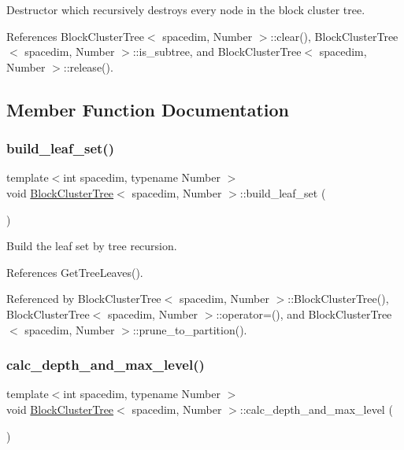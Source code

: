 Destructor which recursively destroys every node in the block cluster tree. 

References Block\+Cluster\+Tree$<$ spacedim, Number $>$\+::clear(), Block\+Cluster\+Tree$<$ spacedim, Number $>$\+::is\+\_\+subtree, and Block\+Cluster\+Tree$<$ spacedim, Number $>$\+::release().



\subsection{Member Function Documentation}
\mbox{\label{classBlockClusterTree_a1b3396fbedf6ec07cce9c23a62b2c30b}} 
\subsubsection{\texorpdfstring{build\+\_\+leaf\+\_\+set()}{build\_leaf\_set()}}
{\footnotesize\ttfamily template$<$int spacedim, typename Number $>$ \\
void \hyperlink{classBlockClusterTree}{Block\+Cluster\+Tree}$<$ spacedim, Number $>$\+::build\+\_\+leaf\+\_\+set (\begin{DoxyParamCaption}{ }\end{DoxyParamCaption})}

Build the leaf set by tree recursion. 

References Get\+Tree\+Leaves().



Referenced by Block\+Cluster\+Tree$<$ spacedim, Number $>$\+::\+Block\+Cluster\+Tree(), Block\+Cluster\+Tree$<$ spacedim, Number $>$\+::operator=(), and Block\+Cluster\+Tree$<$ spacedim, Number $>$\+::prune\+\_\+to\+\_\+partition().

\mbox{\label{classBlockClusterTree_a7f9dbea25751771830c72d09efacacb2}} 
\subsubsection{\texorpdfstring{calc\+\_\+depth\+\_\+and\+\_\+max\+\_\+level()}{calc\_depth\_and\_max\_level()}}
{\footnotesize\ttfamily template$<$int spacedim, typename Number $>$ \\
void \hyperlink{classBlockClusterTree}{Block\+Cluster\+Tree}$<$ spacedim, Number $>$\+::calc\+\_\+depth\+\_\+and\+\_\+max\+\_\+level (\begin{DoxyParamCaption}{ }\end{DoxyParamCaption})}

